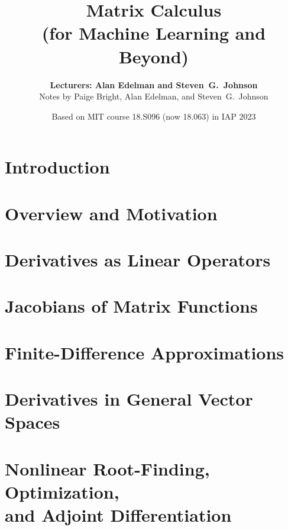 \documentclass{article}
\title{Matrix Calculus \\ (for Machine Learning and Beyond)}
\author{\textbf{Lecturers: Alan Edelman and Steven~G.~Johnson} \\ Notes by Paige Bright, Alan Edelman, and Steven~G.~Johnson}
\date{Based on MIT course 18.S096 (now 18.063) in IAP 2023}
\begin{document}
\maketitle

\tableofcontents

\pagebreak

\section*{Introduction}


\pagebreak

\section{Overview and Motivation}


\pagebreak

\section{Derivatives as Linear Operators} \label{sec1S}



\pagebreak

\section{Jacobians of Matrix Functions}
\label{sec:kronecker}


\pagebreak

\section{Finite-Difference Approximations}
\label{sec:finitedifference}


\pagebreak
\section{Derivatives in General Vector Spaces}
\label{sec:generalvectorspaces}


\pagebreak

\section[Nonlinear Root-Finding, Optimization, and Adjoint Differentiation]{Nonlinear Root-Finding, Optimization,\\ and Adjoint Differentiation}

\end{document}
